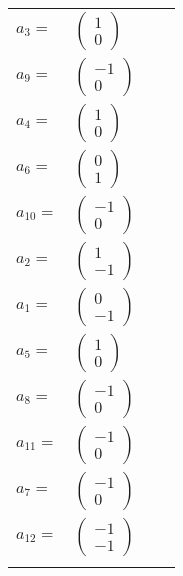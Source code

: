 \documentclass[1p]{elsarticle_modified}
\theoremstyle{definition}
\begin{document}
\begin{tabular}{m{7pt} m{180pt} m{7pt} m{180pt} }
\flushright $a_{3}=$&$\begin{pmatrix}1\\0\end{pmatrix}$ \\
\flushright $a_{9}=$&$\begin{pmatrix}-1\\0\end{pmatrix}$ \\
\flushright $a_{4}=$&$\begin{pmatrix}1\\0\end{pmatrix}$ \\
\flushright $a_{6}=$&$\begin{pmatrix}0\\1\end{pmatrix}$ \\
\flushright $a_{10}=$&$\begin{pmatrix}-1\\0\end{pmatrix}$ \\
\flushright $a_{2}=$&$\begin{pmatrix}1\\-1\end{pmatrix}$ \\
\flushright $a_{1}=$&$\begin{pmatrix}0\\-1\end{pmatrix}$ \\
\flushright $a_{5}=$&$\begin{pmatrix}1\\0\end{pmatrix}$ \\
\flushright $a_{8}=$&$\begin{pmatrix}-1\\0\end{pmatrix}$ \\
\flushright $a_{11}=$&$\begin{pmatrix}-1\\0\end{pmatrix}$ \\
\flushright $a_{7}=$&$\begin{pmatrix}-1\\0\end{pmatrix}$ \\
\flushright $a_{12}=$&$\begin{pmatrix}-1\\-1\end{pmatrix}$\\&\end{tabular}
\end{document}
